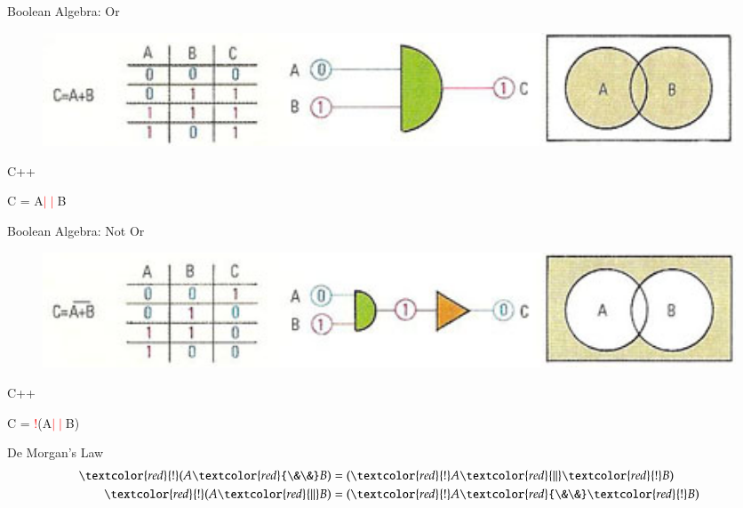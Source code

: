\documentclass[xcolor={dvipsnames}]{beamer}
\begin{document}
\begin{frame}{Boolean Algebra: Or}
\begin{figure}
		\href{http://www.daviddarling.info/encyclopedia/B/Boolean_algebra.html}{\includegraphics[width=1\textwidth]{or}}
\end{figure}
\pause
	\begin{block}{C++}
		\begin{center}
			{\LARGE C = A\textcolor{red}{$\mid\mid$}B}
		\end{center}
	\end{block}
\end{frame}

\begin{frame}{Boolean Algebra: Not Or}
\begin{figure}
		\href{http://www.daviddarling.info/encyclopedia/B/Boolean_algebra.html}{\includegraphics[width=1\textwidth]{not_or}}
	\end{figure}
	\pause
	\begin{block}{C++}
		\begin{center}
			{\LARGE C = \textcolor{red}{!}(A\textcolor{red}{$\mid\mid$}B)}
		\end{center}
	\end{block}
\end{frame}

\begin{frame}{De Morgan's Law}
	\begin{align*}
	\textcolor{red}{!}(A\textcolor{red}{\&\&}B)  &= (\textcolor{red}{!}A \textcolor{red}{\mid\mid}\textcolor{red}{!}B)\\
	\textcolor{red}{!}(A\textcolor{red}{\mid\mid}B)  &= (\textcolor{red}{!}A \textcolor{red}{\&\&}\textcolor{red}{!}B)
	\end{align*}
\end{frame}
\end{document}
